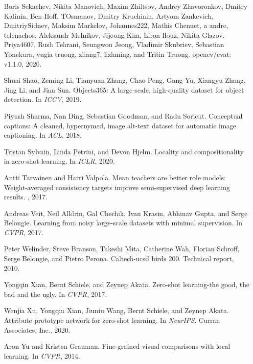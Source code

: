 \documentclass[10pt,twocolumn,letterpaper]{article}
\begin{document}
\begin{thebibliography}{10}
Boris Sekachev, Nikita Manovich, Maxim Zhiltsov, Andrey Zhavoronkov, Dmitry
  Kalinin, Ben Hoff, TOsmanov, Dmitry Kruchinin, Artyom Zankevich,
  DmitriySidnev, Maksim Markelov, Johannes222, Mathis Chenuet, a andre,
  telenachos, Aleksandr Melnikov, Jijoong Kim, Liron Ilouz, Nikita Glazov,
  Priya4607, Rush Tehrani, Seungwon Jeong, Vladimir Skubriev, Sebastian
  Yonekura, vugia truong, zliang7, lizhming, and Tritin Truong.
\newblock opencv/cvat: v1.1.0, 2020.

Shuai Shao, Zeming Li, Tianyuan Zhang, Chao Peng, Gang Yu, Xiangyu Zhang, Jing
  Li, and Jian Sun.
\newblock Objects365: A large-scale, high-quality dataset for object detection.
\newblock In {\em ICCV}, 2019.

Piyush Sharma, Nan Ding, Sebastian Goodman, and Radu Soricut.
\newblock Conceptual captions: A cleaned, hypernymed, image alt-text dataset
  for automatic image captioning.
\newblock In {\em ACL}, 2018.

Tristan Sylvain, Linda Petrini, and Devon Hjelm.
\newblock Locality and compositionality in zero-shot learning.
\newblock In {\em ICLR}, 2020.

Antti Tarvainen and Harri Valpola.
\newblock Mean teachers are better role models: Weight-averaged consistency
  targets improve semi-supervised deep learning results.
, 2017.

Andreas Veit, Neil Alldrin, Gal Chechik, Ivan Krasin, Abhinav Gupta, and Serge
  Belongie.
\newblock Learning from noisy large-scale datasets with minimal supervision.
\newblock In {\em CVPR}, 2017.

Peter Welinder, Steve Branson, Takeshi Mita, Catherine Wah, Florian Schroff,
  Serge Belongie, and Pietro Perona.
\newblock Caltech-ucsd birds 200.
\newblock Technical report, 2010.

Yongqin Xian, Bernt Schiele, and Zeynep Akata.
\newblock Zero-shot learning-the good, the bad and the ugly.
\newblock In {\em CVPR}, 2017.

Wenjia Xu, Yongqin Xian, Jiuniu Wang, Bernt Schiele, and Zeynep Akata.
\newblock Attribute prototype network for zero-shot learning.
\newblock In {\em NeurIPS}. Curran Associates, Inc., 2020.

Aron Yu and Kristen Grauman.
\newblock Fine-grained visual comparisons with local learning.
\newblock In {\em CVPR}, 2014.


\end{thebibliography}
\end{document}
